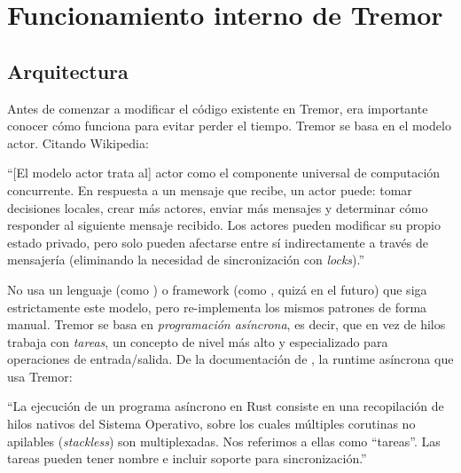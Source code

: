 \chapter{Funcionamiento interno de Tremor}\label{annex:tremor}

\section{Arquitectura}

Antes de comenzar a modificar el código existente en Tremor, era importante
conocer cómo funciona para evitar perder el tiempo. Tremor se basa en el modelo
actor. Citando Wikipedia:


``[El modelo actor trata al] actor como el componente universal de computación
concurrente. En respuesta a un mensaje que recibe, un actor puede: tomar
decisiones locales, crear más actores, enviar más mensajes y determinar cómo
responder al siguiente mensaje recibido. Los actores pueden modificar su propio
estado privado, pero solo pueden afectarse entre sí indirectamente a través de
mensajería (eliminando la necesidad de sincronización con
\emph{locks}).''~\cite{wikiactor}

No usa un lenguaje (como ) o framework (como
, quizá en el futuro) que siga estrictamente este modelo, pero
re-implementa los mismos patrones de forma manual. Tremor se basa en
\emph{programación asíncrona}, es decir, que en vez de hilos trabaja con
\emph{tareas}, un concepto de nivel más alto y especializado para operaciones de
entrada/salida. De la documentación de , la runtime
asíncrona que usa Tremor:


``La ejecución de un programa asíncrono en Rust consiste en una recopilación de
hilos nativos del Sistema Operativo, sobre los cuales múltiples corutinas no
apilables (\emph{stackless}) son multiplexadas. Nos referimos a ellas como
``tareas''. Las tareas pueden tener nombre e incluir soporte para
sincronización.''~\cite{asyncstd_task}


